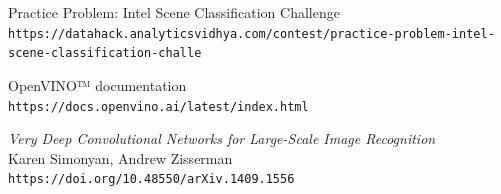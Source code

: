 \documentclass[compsoc]{IEEEtran}
\begin{document}



\begin{thebibliography}{9}

Practice Problem: Intel Scene Classification Challenge \\
\texttt{https://datahack.analyticsvidhya.com/contest/practice-problem-intel-scene-classification-challe}

OpenVINO™ documentation \\
\texttt{https://docs.openvino.ai/latest/index.html}

\emph{Very Deep Convolutional Networks for Large-Scale Image Recognition} \\
Karen Simonyan, Andrew Zisserman \\
\texttt{https://doi.org/10.48550/arXiv.1409.1556}

\end{thebibliography}
\end{document}
